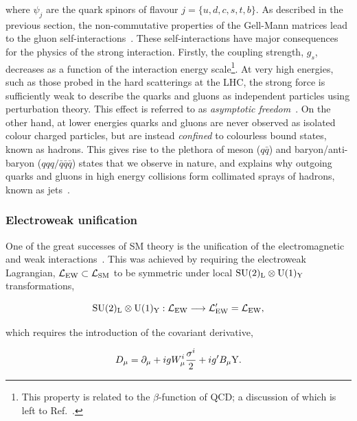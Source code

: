 \noindent
where $\psi_j$ are the quark spinors of flavour $j=\{u,d,c,s,t,b\}$. As described in the previous section, the non-commutative properties of the Gell-Mann matrices lead to the gluon self-interactions~\cite{Halzen:1984mc}. These self-interactions have major consequences for the physics of the strong interaction. Firstly, the coupling strength, $g_s$, decreases as a function of the interaction energy scale\footnote{This property is related to the $\beta$-function of QCD; a discussion of which is left to Ref.~\cite{Halzen:1984mc}.}. At very high energies, such as those probed in the hard scatterings at the LHC, the strong force is sufficiently weak to describe the quarks and gluons as independent particles using perturbation theory. This effect is referred to as \textit{asymptotic freedom}~\cite{PhysRevLett.30.1343}. On the other hand, at lower energies quarks and gluons are never observed as isolated colour charged particles, but are instead \textit{confined} to colourless bound states, known as hadrons. This gives rise to the plethora of meson ($q\bar{q}$) and baryon/anti-baryon ($qqq/\bar{q}\bar{q}\bar{q}$) states that we observe in nature, and explains why outgoing quarks and gluons in high energy collisions form collimated sprays of hadrons, known as jets~\cite{Salam:2009jx}.

\subsubsection{Electroweak unification}
One of the great successes of SM theory is the unification of the electromagnetic and weak interactions~\cite{Glashow:1961tr,Weinberg:1967tq,Salam:1968rm}. This was achieved by requiring the electroweak Lagrangian, $\mathcal{L}_{\rm{EW}} \subset \mathcal{L}_{\rm{SM}}$ to be symmetric under local ${\rm{SU}(2)_{\rm{L}}}\otimes{\rm{U}}(1)_{\rm{Y}}$ transformations,

\begin{equation}
    {\rm{SU}}(2)_{\rm{L}}\otimes{\rm{U}}(1)_{\rm{Y}}: \mathcal{L}_{\rm{EW}} \longrightarrow \mathcal{L}'_{\rm{EW}} = \mathcal{L}_{\rm{EW}},
\end{equation}

\noindent
which requires the introduction of the covariant derivative,

\begin{equation}\label{eq:ew_covariant}
    D_\mu = \partial_\mu + i g W^i_\mu \frac{\sigma^i}{2} + i g' B_\mu {\rm{Y}}. %
\end{equation}

